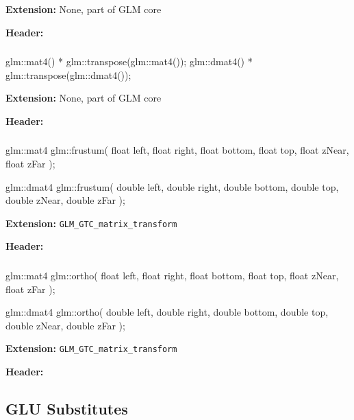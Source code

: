 \documentclass{scrartcl}
\numberwithin{figure}{subsection}
\begin{document}
\textbf{Extension:} None, part of GLM core

\textbf{Header:} 

\subsubsection{}

\begin{cppcode}
glm::mat4() * glm::transpose(glm::mat4());
glm::dmat4() * glm::transpose(glm::dmat4());
\end{cppcode}

\textbf{Extension:} None, part of GLM core

\textbf{Header:} 


\subsubsection{}

\begin{cppcode}
glm::mat4 glm::frustum(
  float left, float right,
  float bottom, float top,
  float zNear, float zFar
);

glm::dmat4 glm::frustum(
  double left, double right,
  double bottom, double top,
  double zNear, double zFar
);
\end{cppcode}

\textbf{Extension:} \verb|GLM_GTC_matrix_transform|

\textbf{Header:} 
 

\subsubsection{}

\begin{cppcode}
glm::mat4 glm::ortho(
  float left, float right, 
  float bottom, float top, 
  float zNear, float zFar
);

glm::dmat4 glm::ortho(
  double left, double right, 
  double bottom, double top, 
  double zNear, double zFar
);
\end{cppcode}

\textbf{Extension:} \verb|GLM_GTC_matrix_transform|

\textbf{Header:} 

\subsection{GLU Substitutes}
\end{document}
